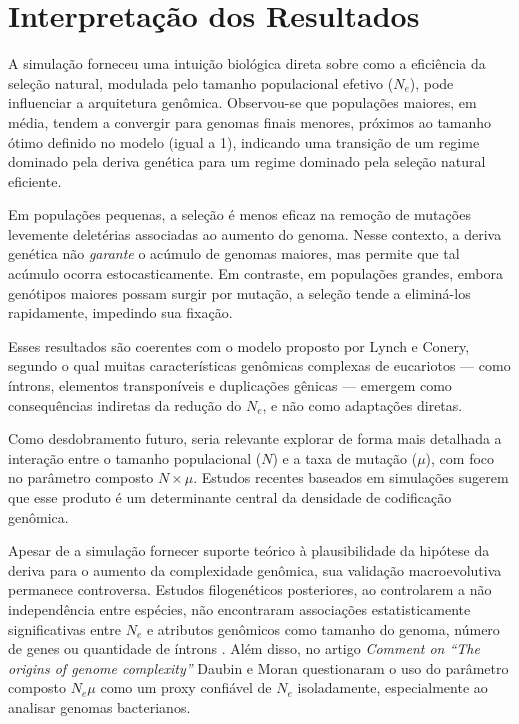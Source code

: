 
\section{Interpretação dos Resultados}

A simulação forneceu uma intuição biológica direta sobre como a eficiência da seleção natural, modulada pelo tamanho populacional efetivo ($N_e$), pode influenciar a arquitetura genômica. Observou-se que populações maiores, em média, tendem a convergir para genomas finais menores, próximos ao tamanho ótimo definido no modelo (igual a 1), indicando uma transição de um regime dominado pela deriva genética para um regime dominado pela seleção natural eficiente.

Em populações pequenas, a seleção é menos eficaz na remoção de mutações levemente deletérias associadas ao aumento do genoma. Nesse contexto, a deriva genética não \emph{garante} o acúmulo de genomas maiores, mas permite que tal acúmulo ocorra estocasticamente. Em contraste, em populações grandes, embora genótipos maiores possam surgir por mutação, a seleção tende a eliminá-los rapidamente, impedindo sua fixação.

Esses resultados são coerentes com o modelo proposto por Lynch e Conery, segundo o qual muitas características genômicas complexas de eucariotos — como íntrons, elementos transponíveis e duplicações gênicas — emergem como consequências indiretas da redução do $N_e$, e não como adaptações diretas.

Como desdobramento futuro, seria relevante explorar de forma mais detalhada a interação entre o tamanho populacional ($N$) e a taxa de mutação ($\mu$), com foco no parâmetro composto $N \times \mu$. Estudos recentes baseados em simulações sugerem que esse produto é um determinante central da densidade de codificação genômica\cite{LuiselliEtAl2024}. 

Apesar de a simulação fornecer suporte teórico à plausibilidade da hipótese da deriva para o aumento da complexidade genômica, sua validação macroevolutiva permanece controversa. Estudos filogenéticos posteriores, ao controlarem a não independência entre espécies, não encontraram associações estatisticamente significativas entre $N_e$ e atributos genômicos como tamanho do genoma, número de genes ou quantidade de íntrons \cite{WhitneyGarland2010}. Além disso, no artigo \textit{Comment on ``The origins of genome complexity''} Daubin e Moran questionaram o uso do parâmetro composto $N_e \mu$ como um proxy confiável de $N_e$ isoladamente, especialmente ao analisar genomas bacterianos\cite{DaubinMoran2004}.

